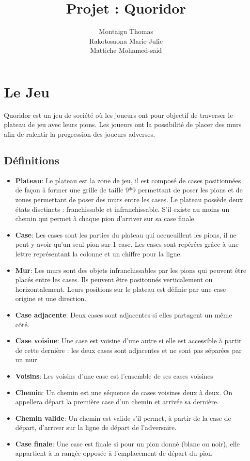 \documentclass[a4paper, draft]{article}
\title{Projet : Quoridor}
\author{Montaigu Thomas \\ Rakotosaona Marie-Julie \\ Mattiche Mohamed-said}
\begin{document}
\maketitle

\newpage
\tableofcontents
\newpage

\section{Le Jeu}
Quoridor est un jeu de société où les joueurs ont pour objectif de traverser  le plateau de jeu avec leurs pions. Les joueurs ont la possibilité de placer des murs afin de ralentir la progression des joueurs adverses.

\subsection{Définitions}

\begin{itemize}

\item \textbf{Plateau}: Le plateau est la zone de jeu, il est composé de cases positionnées de façon à former une grille  de taille 9*9 permettant de poser les pions et de zones permettant de poser des murs entre les cases. Le plateau possède deux états disctincts : franchissable et infranchissable. S'il existe au moins un chemin qui permet à chaque pion d'arriver sur sa case finale. 


\item \textbf{Case}: Les cases sont les parties du plateau qui accueuillent les pions, il ne peut y avoir qu'un seul pion sur 1 case.
Les cases sont repérées grâce à une lettre représentant la colonne et un chiffre pour la ligne.


\item \textbf{Mur}: Les murs sont des objets infranchissables par les pions qui peuvent être placés entre les cases. Ils peuvent être positonnés verticalement ou horizontalement. Leurs positions sur le plateau est définie par une case origine  et une direction.
\item \textbf{Case adjacente}: Deux cases sont adjacentes si elles partagent un même côté.
\item \textbf{Case voisine}: Une case est voisine d'une autre si elle est accessible à partir de cette dernière : les deux cases sont adjacentes et ne sont pas séparées par un mur.
\item \textbf{Voisins}: Les voisins d'une case est l'ensemble de ses cases voisines
\item \textbf{Chemin}: Un chemin est une séquence de cases voisines deux à deux. On appellera départ la première case d'un chemin et arrivée sa dernière.
\item \textbf{Chemin valide}: Un chemin est valide s'il permet, à partir de la case de départ, d'arriver sur la ligne de départ de l'adversaire. 
\item \textbf{Case finale}: Une case est finale si pour un pion donné (blanc ou noir), elle appartient à la rangée opposée à l'emplacement de départ du pion 
\end{itemize}
\end{document}
